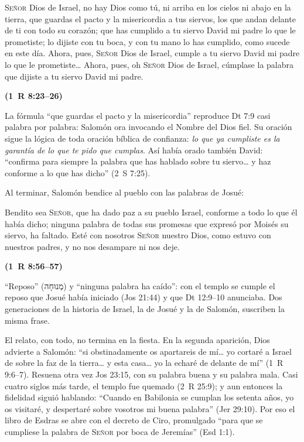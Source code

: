 \documentclass[11pt,letterpaper]{article}
\newcommand{\heb}[1]{\mbox{\foreignlanguage{hebrew}{#1}}}
\newcommand{\SENOR}{\textsc{Señor}}
\newcommand{\fuente}[1]{\par\hfill{\upshape\bfseries\small\textcolor{azul}{#1}}}
\begin{document}
\begin{cita}\SENOR{} Dios de Israel, no hay Dios como tú, ni arriba en los cielos ni abajo en la tierra, que guardas el pacto y la misericordia a tus siervos, los que andan delante de ti con todo su corazón; que has cumplido a tu siervo David mi padre lo que le prometiste; lo dijiste con tu boca, y con tu mano lo has cumplido, como sucede en este día. Ahora, pues, \SENOR{} Dios de Israel, cumple a tu siervo David mi padre lo que le prometiste\ldots{} Ahora, pues, oh \SENOR{} Dios de Israel, cúmplase la palabra que dijiste a tu siervo David mi padre.\fuente{(1~R 8:23--26)}\end{cita}

La fórmula ``que guardas el pacto y la misericordia'' reproduce Dt 7:9 casi palabra por palabra: Salomón ora invocando el Nombre del Dios fiel. Su oración sigue la lógica de toda oración bíblica de confianza: \emph{lo que ya cumpliste es la garantía de lo que te pido que cumplas}. Así había orado también David: ``confirma para siempre la palabra que has hablado sobre tu siervo\ldots{} y haz conforme a lo que has dicho'' (2~S 7:25).

Al terminar, Salomón bendice al pueblo con las palabras de Josué:

\begin{cita}Bendito sea \SENOR, que ha dado paz a su pueblo Israel, conforme a todo lo que él había dicho; ninguna palabra de todas sus promesas que expresó por Moisés su siervo, ha faltado. Esté con nosotros \SENOR{} nuestro Dios, como estuvo con nuestros padres, y no nos desampare ni nos deje.\fuente{(1~R 8:56--57)}\end{cita}

``Reposo'' (\heb{מְנוּחָה}) y ``ninguna palabra ha caído'': con el templo se cumple el reposo que Josué había iniciado (Jos 21:44) y que Dt 12:9--10 anunciaba. Dos generaciones de la historia de Israel, la de Josué y la de Salomón, suscriben la misma frase.

El relato, con todo, no termina en la fiesta. En la segunda aparición, Dios advierte a Salomón: ``si obstinadamente os apartareis de mí\ldots{} yo cortaré a Israel de sobre la faz de la tierra\ldots{} y esta casa\ldots{} yo la echaré de delante de mí'' (1~R 9:6--7). Resuena otra vez Jos 23:15, con su palabra buena y su palabra mala. Casi cuatro siglos más tarde, el templo fue quemado (2~R 25:9); y aun entonces la fidelidad siguió hablando: ``Cuando en Babilonia se cumplan los setenta años, yo os visitaré, y despertaré sobre vosotros mi buena palabra'' (Jer 29:10). Por eso el libro de Esdras se abre con el decreto de Ciro, promulgado ``para que se cumpliese la palabra de \SENOR{} por boca de Jeremías'' (Esd 1:1).
\end{document}
